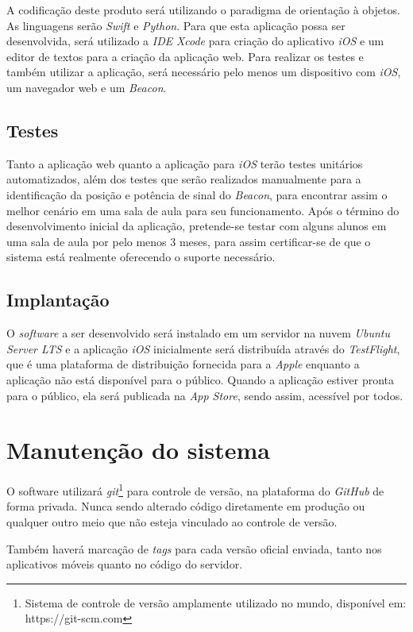 \documentclass[
	12pt,
	oneside,
	a4paper,
	english,
	brazil,
]{abntex2}
\begin{document}
A codificação deste produto será utilizando o paradigma de orientação à objetos. As linguagens serão \emph{Swift} e \emph{Python}. Para que esta aplicação possa ser desenvolvida, será utilizado a \emph{IDE} \emph{Xcode} para criação do aplicativo \emph{iOS} e um editor de textos para a criação da aplicação web. Para realizar os testes e também utilizar a aplicação, será necessário pelo menos um dispositivo com \emph{iOS}, um navegador web e um \emph{Beacon}.

\subsection{Testes}

Tanto a aplicação web quanto a aplicação para \emph{iOS} terão testes unitários automatizados, além dos testes que serão realizados manualmente para a identificação da posição e potência de sinal do \emph{Beacon}, para encontrar assim o melhor cenário em uma sala de aula para seu funcionamento. Após o término do desenvolvimento inicial da aplicação, pretende-se testar com alguns alunos em uma sala de aula por pelo menos 3 meses, para assim certificar-se de que o sistema está realmente oferecendo o suporte necessário.

\subsection{Implantação}

O \emph{software} a ser desenvolvido será instalado em um servidor na nuvem \emph{Ubuntu Server LTS} e a aplicação \emph{iOS} inicialmente será distribuída através do \emph{TestFlight}, que é uma plataforma de distribuição fornecida para a \emph{Apple} enquanto a aplicação não está disponível para o público. Quando a aplicação estiver pronta para o público, ela será publicada na \emph{App Store}, sendo assim, acessível por todos.

\section{Manutenção do sistema}

O software utilizará \emph{git}\footnote{Sistema de controle de versão amplamente utilizado no mundo, disponível em: https://git-scm.com} para controle de versão, na plataforma do \emph{GitHub} de forma privada. Nunca sendo alterado código diretamente em produção ou qualquer outro meio que não esteja vinculado ao controle de versão.

Também haverá marcação de \emph{tags} para cada versão oficial enviada, tanto nos aplicativos móveis quanto no código do servidor.
\end{document}
